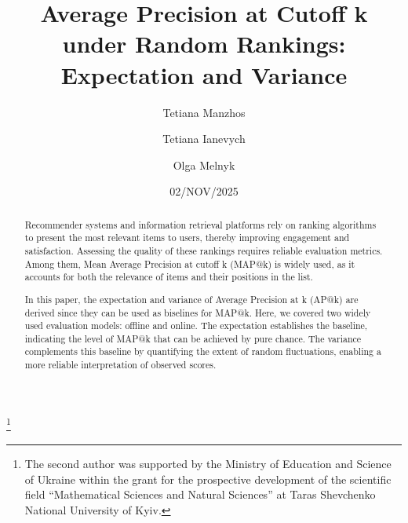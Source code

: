 \documentclass{tpms-l}
\theoremstyle{definition}
\theoremstyle{remark}
\numberwithin{equation}{section}
\begin{document}
\title{Average Precision at Cutoff k under Random Rankings: Expectation and Variance}


\author{Tetiana Manzhos}
\address{Department of Advanced Mathematics,
Kyiv National Economic University named after Vadym Hetman, Kyiv 03057, Ukraine}

\author{Tetiana Ianevych} 
\address{Department of Probability Theory, Statistics and Actuarial Mathematics, Taras Shevchenko National University of Kyiv, Kyiv 01601, Ukraine}
\thanks{The second author was supported by the Ministry of Education and Science of Ukraine within the grant for the prospective development of the scientific field “Mathematical Sciences and Natural Sciences” at Taras Shevchenko National University of Kyiv.}
 
\author{Olga Melnyk}
\address{Department of Advanced Mathematics,
Kyiv National Economic University named after Vadym Hetman, Kyiv 03057, Ukraine}


\date{02/NOV/2025}



\begin{abstract}
Recommender systems and information retrieval platforms rely on ranking algorithms to present the most relevant items to users, thereby improving engagement and satisfaction. Assessing the quality of these rankings requires reliable evaluation metrics. Among them, Mean Average Precision at cutoff k (MAP@k) is widely used, as it accounts for both the relevance of items and their positions in the list. 

In this paper, the expectation and variance of Average Precision at k (AP@k) are derived since they can be used as biselines for MAP@k. Here, we covered two widely used evaluation models: offline and online. The expectation establishes the baseline, indicating the level of MAP@k that can be achieved by pure chance. The variance complements this baseline by quantifying the extent of random fluctuations, enabling a more reliable interpretation of observed scores. 
\end{abstract}
\end{document}
